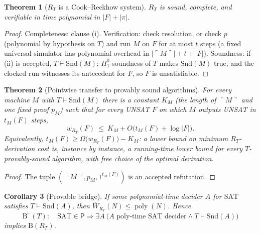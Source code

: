 \documentclass[11pt]{article}
\newtheorem{theorem}{Theorem}
\newtheorem{corollary}[theorem]{Corollary}
\theoremstyle{definition}
\newcommand{\SAT}{\mathrm{SAT}}
\newcommand{\poly}{\operatorname{poly}}
\newcommand{\Wbar}{\overline W}
\begin{document}
\begin{theorem}[$R_T$ is a Cook--Reckhow system]\label{thm:proofsystem}
$R_T$ is sound, complete, and verifiable in time polynomial in $|F|+|\pi|$.
\end{theorem}
\begin{proof}
Completeness: clause (i). Verification: check resolution, or check $p$ (polynomial
by hypothesis on $T$) and run $M$ on $F$ for at most $t$ steps (a fixed universal
simulator has polynomial overhead in $|\ulcorner M\urcorner|+t+|F|$). Soundness:
if (ii) is accepted, $T\vdash\mathrm{Snd}(M)$; $\Pi^0_1$-soundness of $T$ makes
$\mathrm{Snd}(M)$ true, and the clocked run witnesses its antecedent for $F$, so
$F$ is unsatisfiable.
\end{proof}

\begin{theorem}[Pointwise transfer to provably sound algorithms]\label{thm:pointwise}
For every machine $M$ with $T\vdash\mathrm{Snd}(M)$ there is a constant $K_M$
(the length of $\ulcorner M\urcorner$ and one fixed proof $p_M$) such that for
every UNSAT $F$ on which $M$ outputs UNSAT in $t_M(F)$ steps,
\[
 w_{R_T}(F)\ \le\ K_M + O\bigl(t_M(F)+\log|F|\bigr).
\]
Equivalently, $t_M(F)\ge \Omega\bigl(w_{R_T}(F)\bigr)-K_M$: a lower bound on minimum
$R_T$-derivation cost is, instance by instance, a running-time lower bound for every
$T$-provably-sound algorithm, with free choice of the optimal derivation.
\end{theorem}
\begin{proof}
The tuple $(\ulcorner M\urcorner,p_M,1^{t_M(F)})$ is an accepted refutation.
\end{proof}

\begin{corollary}[Provable bridge]\label{cor:bridge}
If some polynomial-time decider $A$ for $\SAT$ satisfies $T\vdash\mathrm{Snd}(A)$,
then $\Wbar_{R_T}(N)\le\poly(N)$. Hence
\[
 \mathrm{B}^{\vdash}(T):\quad \SAT\in\mathsf P\Longrightarrow
 \exists A\ \bigl(A\text{ poly-time SAT decider}\wedge T\vdash\mathrm{Snd}(A)\bigr)
\]
implies $\mathrm B(R_T)$.
\end{corollary}
\end{document}

